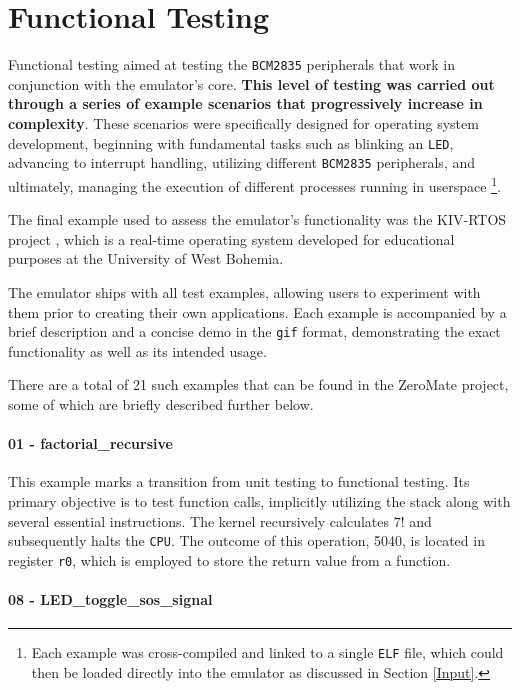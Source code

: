 \documentclass[english, ing, kiv, he, iso690numb, pdf]{fasthesis}
\begin{document}
	\section{Functional Testing}
	
	Functional testing aimed at testing the \texttt{BCM2835} peripherals that work in conjunction with the emulator's core. \textbf{This level of testing was carried out through a series of example scenarios that progressively increase in complexity}. These scenarios were specifically designed for operating system development, beginning with fundamental tasks such as blinking an \texttt{LED}, advancing to interrupt handling, utilizing different \texttt{BCM2835} peripherals, and ultimately, managing the execution of different processes running in userspace \footnote{Each example was cross-compiled and linked to a single \texttt{ELF} file, which could then be loaded directly into the emulator as discussed in Section \ref{Input}.}.
	
	The final example used to assess the emulator's functionality was the KIV-RTOS project \cite{KIV-RTOS}, which is a real-time operating system developed for educational purposes at the University of West Bohemia.
	
	\begin{important}
		The emulator ships with all test examples, allowing users to experiment with them prior to creating their own applications. Each example is accompanied by a brief description and a concise demo in the \texttt{gif} format, demonstrating the exact functionality as well as its intended usage.
	\end{important}
	
	There are a total of 21 such examples that can be found in the ZeroMate project, some of which are briefly described further below. 
	
	\paragraph{01 - factorial\_recursive}
	
	This example marks a transition from unit testing to functional testing. Its primary objective is to test function calls, implicitly utilizing the stack along with several essential instructions. The kernel recursively calculates $7!$ and subsequently halts the \texttt{CPU}. The outcome of this operation, 5040, is located in register \texttt{r0}, which is employed to store the return value from a function.
	
	\paragraph{08 - LED\_toggle\_sos\_signal}
	
\end{document}
